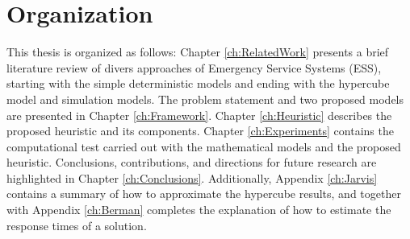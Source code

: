 \section{Organization}
This thesis is organized as follows:
Chapter \ref{ch:RelatedWork}
presents a brief literature review
of divers approaches of Emergency Service Systems (ESS),
starting with the simple deterministic models
and ending with the hypercube model and simulation models.
The problem statement
and two proposed models are presented in Chapter \ref{ch:Framework}.
Chapter \ref{ch:Heuristic} describes the proposed heuristic
and its components.
Chapter \ref{ch:Experiments} contains
the computational test
carried out
with the mathematical models
and the proposed heuristic.
Conclusions, contributions, 
and directions for future research
are highlighted in Chapter \ref{ch:Conclusions}.
Additionally, Appendix \ref{ch:Jarvis}
contains a summary of how to approximate the hypercube results,
and together with Appendix \ref{ch:Berman}
completes the explanation of how to estimate
the response times of a solution.
